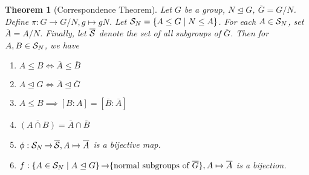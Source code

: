 \documentclass[11pt]{book}
\newcounter{counter}
\newtheorem{theorem}[counter]{Theorem}   \newtheorem*{theorem*}{Theorem}   \newtheorem{lemma}[counter]{Lemma}   \newtheorem{corollary}[counter]{Corollary}
\theoremstyle{definition}   \newtheorem{defn}[counter]{Definition} %
\newcommand{\ov}{\overline}   \newcommand{\wt}{\widetilde}
\newcommand{\nsg}{\mathrel{\unlhd}}   \newcommand{\ind}{\parindent24pt}   \newcommand{\vn}{\varnothing}
\DeclareMathOperator{\ra}{\rightarrow}   \DeclareMathOperator{\Poly}{\mathbf{P}}   \DeclareMathOperator{\spn}{\textnormal{span}}   \DeclareMathOperator{\aut}{\textnormal{Aut}}
\numberwithin{counter}{chapter}
\begin{document}
\begin{theorem}[Correspondence Theorem]
Let $G$ be a group, $N \nsg G$, $\ov{G} = G/N$. Define $\pi : G \ra G/N, g \mapsto gN$. Let $\mathcal{S}_N = \{A \leq G \mid N \leq A\}$. For each $A \in \mathcal{S}_N$, set $\ov{A} = A/N$. Finally, let $\ov{\mc{S}}$ denote the set of all subgroups of $\ov{G}$. Then for $A,B \in \mathcal{S}_N$, we have
	\begin{enumerate}
	\item[(a)] $A \leq B \iff \ov{A} \leq \ov{B}$
	\item[(b)] $A \nsg G \iff \ov{A} \nsg \ov{G}$
	\item[(c)] $A \leq B \implies [B:A] = [\ov{B} : \ov{A}]$
	\item[(d)] $\ov{(A \cap B)} = \ov{A} \cap \ov{B}$
	\item[(e*)] $\phi : \mc{S}_N \ra \ov{\mc{S}}, A \mapsto \ov{A}$ is a bijective map.
	\item[(f)] $f : \{A \in \mc{S}_N \mid A \nsg G\} \ra \{\textnormal{normal subgroups of } \ov{G}\}, A \mapsto \ov{A}$ is a bijection.
	\end{enumerate}
\end{theorem}
\end{document}
